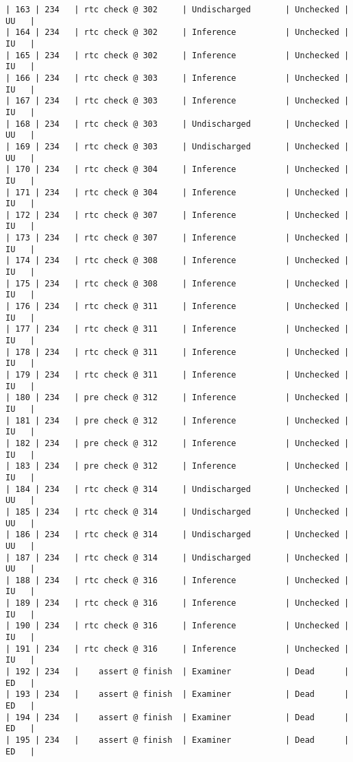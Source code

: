 \begin{lstlisting}[frame=single, gobble=0, caption={POGS report for PCA Pump prototype}]
| 163 | 234   | rtc check @ 302     | Undischarged       | Unchecked |   UU   |
| 164 | 234   | rtc check @ 302     | Inference          | Unchecked |   IU   |
| 165 | 234   | rtc check @ 302     | Inference          | Unchecked |   IU   |
| 166 | 234   | rtc check @ 303     | Inference          | Unchecked |   IU   |
| 167 | 234   | rtc check @ 303     | Inference          | Unchecked |   IU   |
| 168 | 234   | rtc check @ 303     | Undischarged       | Unchecked |   UU   |
| 169 | 234   | rtc check @ 303     | Undischarged       | Unchecked |   UU   |
| 170 | 234   | rtc check @ 304     | Inference          | Unchecked |   IU   |
| 171 | 234   | rtc check @ 304     | Inference          | Unchecked |   IU   |
| 172 | 234   | rtc check @ 307     | Inference          | Unchecked |   IU   |
| 173 | 234   | rtc check @ 307     | Inference          | Unchecked |   IU   |
| 174 | 234   | rtc check @ 308     | Inference          | Unchecked |   IU   |
| 175 | 234   | rtc check @ 308     | Inference          | Unchecked |   IU   |
| 176 | 234   | rtc check @ 311     | Inference          | Unchecked |   IU   |
| 177 | 234   | rtc check @ 311     | Inference          | Unchecked |   IU   |
| 178 | 234   | rtc check @ 311     | Inference          | Unchecked |   IU   |
| 179 | 234   | rtc check @ 311     | Inference          | Unchecked |   IU   |
| 180 | 234   | pre check @ 312     | Inference          | Unchecked |   IU   |
| 181 | 234   | pre check @ 312     | Inference          | Unchecked |   IU   |
| 182 | 234   | pre check @ 312     | Inference          | Unchecked |   IU   |
| 183 | 234   | pre check @ 312     | Inference          | Unchecked |   IU   |
| 184 | 234   | rtc check @ 314     | Undischarged       | Unchecked |   UU   |
| 185 | 234   | rtc check @ 314     | Undischarged       | Unchecked |   UU   |
| 186 | 234   | rtc check @ 314     | Undischarged       | Unchecked |   UU   |
| 187 | 234   | rtc check @ 314     | Undischarged       | Unchecked |   UU   |
| 188 | 234   | rtc check @ 316     | Inference          | Unchecked |   IU   |
| 189 | 234   | rtc check @ 316     | Inference          | Unchecked |   IU   |
| 190 | 234   | rtc check @ 316     | Inference          | Unchecked |   IU   |
| 191 | 234   | rtc check @ 316     | Inference          | Unchecked |   IU   |
| 192 | 234   |    assert @ finish  | Examiner           | Dead      |   ED   |
| 193 | 234   |    assert @ finish  | Examiner           | Dead      |   ED   |
| 194 | 234   |    assert @ finish  | Examiner           | Dead      |   ED   |
| 195 | 234   |    assert @ finish  | Examiner           | Dead      |   ED   |

\end{lstlisting}
